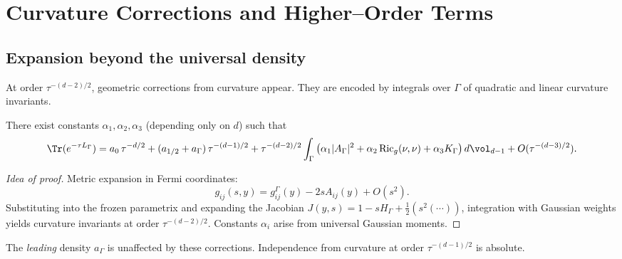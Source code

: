 
\section{Curvature Corrections and Higher–Order Terms}
\label{sec:curvature}

\subsection{Expansion beyond the universal density}
At order $\tau^{-(d-2)/2}$, geometric corrections from curvature appear. They are encoded by integrals over $\Gamma$ of quadratic and linear curvature invariants.

\begin{proposition}\label{prop:curvature}
There exist constants $\alpha_1,\alpha_2,\alpha_3$ (depending only on $d$) such that
\[
\Tr(e^{-\tau L_\Gamma}) =
a_0\,\tau^{-d/2}
+(a_{1/2}+a_\Gamma)\,\tau^{-(d-1)/2}
+\tau^{-(d-2)/2}\int_\Gamma
\big(\alpha_1|A_\Gamma|^2+\alpha_2\,\mathrm{Ric}_g(\nu,\nu)+\alpha_3 K_\Gamma\big)\,d\vol_{d-1}
+O(\tau^{-(d-3)/2}).
\]
\end{proposition}

\begin{proof}[Idea of proof]
Metric expansion in Fermi coordinates:
\[
g_{ij}(s,y)=g^\Gamma_{ij}(y)-2sA_{ij}(y)+O(s^2).
\]
Substituting into the frozen parametrix and expanding the Jacobian $J(y,s)=1-sH_\Gamma+\tfrac12(s^2(\cdots))$, integration with Gaussian weights yields curvature invariants at order $\tau^{-(d-2)/2}$. Constants $\alpha_i$ arise from universal Gaussian moments.
\end{proof}

\begin{remark}[Robustness]
The \emph{leading} density $a_\Gamma$ is unaffected by these corrections. Independence from curvature at order $\tau^{-(d-1)/2}$ is absolute.
\end{remark}

